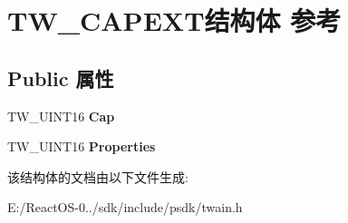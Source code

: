 \hypertarget{struct_t_w___c_a_p_e_x_t}{}\section{T\+W\+\_\+\+C\+A\+P\+E\+X\+T结构体 参考}
\label{struct_t_w___c_a_p_e_x_t}
\subsection*{Public 属性}
\begin{DoxyCompactItemize}
\item 
\mbox{\label{struct_t_w___c_a_p_e_x_t_a0bead22915b526eb89438de6feda06f0}} 
T\+W\+\_\+\+U\+I\+N\+T16 {\bfseries Cap}
\item 
\mbox{\label{struct_t_w___c_a_p_e_x_t_ac10e62e7d80103e91b5936819ef2147e}} 
T\+W\+\_\+\+U\+I\+N\+T16 {\bfseries Properties}
\end{DoxyCompactItemize}


该结构体的文档由以下文件生成\+:\begin{DoxyCompactItemize}
\item 
E\+:/\+React\+O\+S-\/0../sdk/include/psdk/twain.\+h\end{DoxyCompactItemize}
